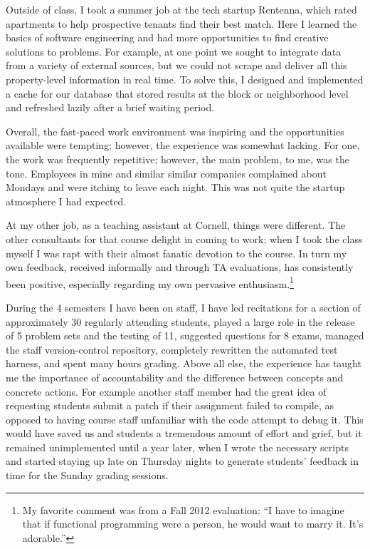 \documentclass{article}
\begin{document}
Outside of class, I took a summer job at the tech startup Rentenna, which rated apartments to help prospective tenants find their best match.
Here I learned the basics of software engineering and had more opportunities to find creative solutions to problems.
For example, at one point we sought to integrate data from a variety of external sources, but we could not scrape and deliver all this property-level information in real time.
To solve this, I designed and implemented a cache for our database that stored results at the block or neighborhood level and refreshed lazily after a brief waiting period.

Overall, the fast-paced work environment was inspiring and the opportunities available were tempting; however, the experience was somewhat lacking.
For one, the work was frequently repetitive; however, the main problem, to me, was the tone. 
Employees in mine and similar similar companies complained about Mondays and were itching to leave each night.
This was not quite the startup atmosphere I had expected.

At my other job, as a teaching assistant at Cornell, things were different.
The other consultants for that course delight in coming to work; when I took the class myself I was rapt with their almost fanatic devotion to the course. 
In turn my own feedback, received informally and through TA evaluations, has consistently been positive, especially regarding my own pervasive enthusiasm.\footnote{My favorite comment was from a Fall 2012 evaluation: ``I have to imagine that if functional programming were a person, he would want to marry it. It's adorable.''}

During the 4 semesters I have been on staff, I have led recitations for a section of approximately 30 regularly attending students, played a large role in the release of 5 problem sets and the testing of 11, suggested questions for 8 exams, managed the staff version-control repository, completely rewritten the automated test harness, and spent many hours grading.
Above all else, the experience has taught me the importance of accountability and the difference between concepts and concrete actions.
For example another staff member had the great idea of requesting students submit a patch if their assignment failed to compile, as opposed to having course staff unfamiliar with the code attempt to debug it.
This would have saved us and students a tremendous amount of effort and grief, but it remained unimplemented until a year later, when I wrote the necessary scripts and started staying up late on Thursday nights to generate students' feedback in time for the Sunday grading sessions.
\end{document}
